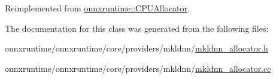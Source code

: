 Reimplemented from \mbox{\hyperlink{classonnxruntime_1_1CPUAllocator_a5eda291e0b728ea21d1f6893b5108020}{onnxruntime\+::\+C\+P\+U\+Allocator}}.



The documentation for this class was generated from the following files\+:\begin{DoxyCompactItemize}
\item 
onnxruntime/onnxruntime/core/providers/mkldnn/\mbox{\hyperlink{mkldnn__allocator_8h}{mkldnn\+\_\+allocator.\+h}}\item 
onnxruntime/onnxruntime/core/providers/mkldnn/\mbox{\hyperlink{mkldnn__allocator_8cc}{mkldnn\+\_\+allocator.\+cc}}\end{DoxyCompactItemize}
